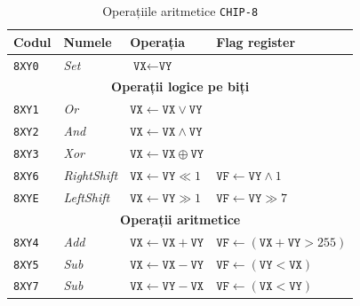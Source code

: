 \documentclass[a4paper]{article}
\begin{document}
\begin{table}
	\centering
	\begin{tabular}{ |l|l|l|l| }
		\hline
		\textbf{Codul} & \textbf{Numele}     & \textbf{Operația}                                  & \textbf{Flag register}                                \\
		\hline
		\texttt{8XY0}  & \textit{Set}        & $\texttt{VX} \gets \texttt{VY}$                    &                                                       \\
		\hline
		\multicolumn{4}{|c|}{\textbf{Operații logice pe biți}}                                                                                            \\
		\hline
		\texttt{8XY1}  & \textit{Or}         & $\texttt{VX} \gets \texttt{VX} \lor   \texttt{VY}$ &                                                       \\
		\texttt{8XY2}  & \textit{And}        & $\texttt{VX} \gets \texttt{VX} \land  \texttt{VY}$ &                                                       \\
		\texttt{8XY3}  & \textit{Xor}        & $\texttt{VX} \gets \texttt{VX} \oplus \texttt{VY}$ &                                                       \\
		\texttt{8XY6}  & \textit{RightShift} & $\texttt{VX} \gets \texttt{VY} \ll 1$              & $\texttt{VF} \gets \texttt{VY} \land 1$               \\
		\texttt{8XYE}  & \textit{LeftShift}  & $\texttt{VX} \gets \texttt{VY} \gg 1$              & $\texttt{VF} \gets \texttt{VY} \gg 7$                 \\
		\hline
		\multicolumn{4}{|c|}{\textbf{Operații aritmetice}}                                                                                                \\
		\hline
		\texttt{8XY4}  & \textit{Add}        & $\texttt{VX} \gets \texttt{VX} + \texttt{VY}$      & $\texttt{VF} \gets (\texttt{VX} + \texttt{VY} > 255)$ \\
		\texttt{8XY5}  & \textit{Sub}        & $\texttt{VX} \gets \texttt{VX} - \texttt{VY}$      & $\texttt{VF} \gets (\texttt{VY} < \texttt{VX})$       \\
		\texttt{8XY7}  & \textit{Sub}        & $\texttt{VX} \gets \texttt{VY} - \texttt{VX}$      & $\texttt{VF} \gets (\texttt{VX} < \texttt{VY})$       \\
		\hline
	\end{tabular}
	\caption{Operațiile aritmetice \texttt{CHIP-8}}\label{table:ops}
\end{table}
\end{document}
